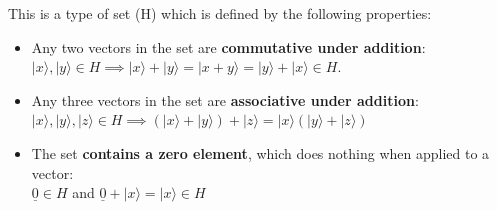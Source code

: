 \documentclass[12pt]{article}
\begin{document}
This is a type of set (H) which is defined by the following properties:

\begin{itemize}
	\item Any two vectors in the set are \textbf{commutative under addition}: \\$\lvert x \rangle, \lvert y \rangle \in H \implies \lvert x \rangle + \lvert y \rangle = \lvert x + y \rangle = \lvert y \rangle + \lvert x \rangle \in H$.
	\item Any three vectors in the set are \textbf{associative under addition}: \\$\lvert x \rangle, \lvert y \rangle, \lvert z \rangle \in H \implies (\lvert x \rangle + \lvert y \rangle) + \lvert z \rangle = \lvert x \rangle (\lvert y \rangle + \lvert z \rangle)$
	\item The set \textbf{contains a zero element}, which does nothing when applied to a vector:\\$\underline{0} \in H$ and $\underline{0} + \lvert x \rangle = \lvert x \rangle \in H$
\end{itemize}
\end{document}
